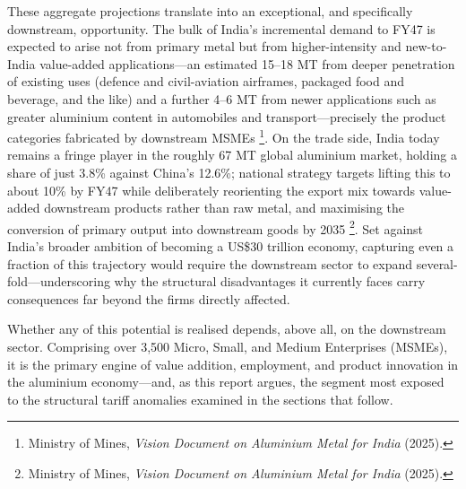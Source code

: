 \documentclass[11pt, a4paper]{article}
\numberwithin{figure}{section}
\numberwithin{table}{section}
\begin{document}
These aggregate projections translate into an exceptional, and specifically downstream, opportunity. The bulk of India's incremental demand to FY47 is expected to arise not from primary metal but from higher-intensity and new-to-India value-added applications---an estimated 15--18 MT from deeper penetration of existing uses (defence and civil-aviation airframes, packaged food and beverage, and the like) and a further 4--6 MT from newer applications such as greater aluminium content in automobiles and transport---precisely the product categories fabricated by downstream MSMEs \cite{mom_vision2025}\footnote{Ministry of Mines, \textit{Vision Document on Aluminium Metal for India} (2025).}. On the trade side, India today remains a fringe player in the roughly 67 MT global aluminium market, holding a share of just 3.8\% against China's 12.6\%; national strategy targets lifting this to about 10\% by FY47 while deliberately reorienting the export mix towards value-added downstream products rather than raw metal, and maximising the conversion of primary output into downstream goods by 2035 \cite{mom_vision2025}\footnote{Ministry of Mines, \textit{Vision Document on Aluminium Metal for India} (2025).}. Set against India's broader ambition of becoming a US\$30 trillion economy, capturing even a fraction of this trajectory would require the downstream sector to expand several-fold---underscoring why the structural disadvantages it currently faces carry consequences far beyond the firms directly affected.

Whether any of this potential is realised depends, above all, on the downstream sector. Comprising over 3,500 Micro, Small, and Medium Enterprises (MSMEs), it is the primary engine of value addition, employment, and product innovation in the aluminium economy---and, as this report argues, the segment most exposed to the structural tariff anomalies examined in the sections that follow. 
\end{document}
